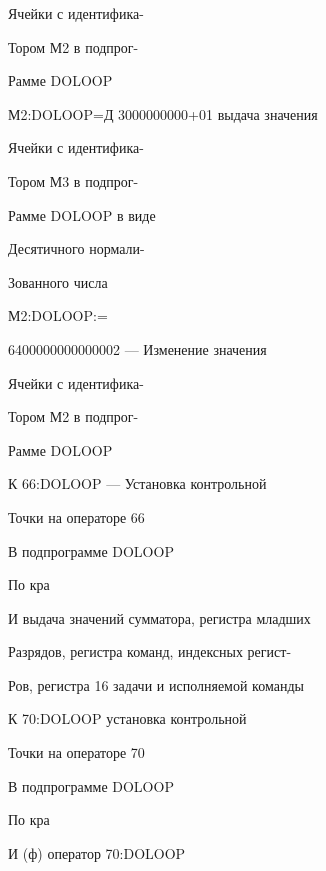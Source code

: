 \documentclass[11pt,a4paper]{article}
\begin{document}
\begin{center}Ячейки с идентифика-\end{center}
\begin{center}Тором М2 в подпрог-\end{center}
\begin{center}Рамме DOLOOP\end{center}
М2:DOLOOP=Д 3000000000+01 выдача значения

\begin{center}Ячейки с идентифика-\end{center}
\begin{center}Тором М3 в подпрог-\end{center}
\begin{center}Рамме DOLOOP в виде\end{center}
\begin{center}Десятичного нормали-\end{center}
\begin{center}Зованного числа\end{center}
М2:DOLOOP:=

6400000000000002 --- Изменение значения

\begin{center}Ячейки с идентифика-\end{center}
\begin{center}Тором М2 в подпрог-\end{center}
\begin{center}Рамме DOLOOP\end{center}
К 66:DOLOOP --- Установка контрольной

\begin{center}Точки на операторе 66\end{center}
\begin{center}В подпрограмме DOLOOP\end{center}
\begin{center}По кра\end{center}
И выдача значений сумматора, регистра младших

\begin{center}Разрядов, регистра команд, индексных регист-\end{center}
\begin{center}Ров, регистра 16 задачи и исполняемой команды\end{center}
К 70:DOLOOP установка контрольной

\begin{center}Точки на операторе 70\end{center}
\begin{center}В подпрограмме DOLOOP\end{center}
\begin{center}По кра\end{center}
И (ф) оператор 70:DOLOOP
\end{document}
